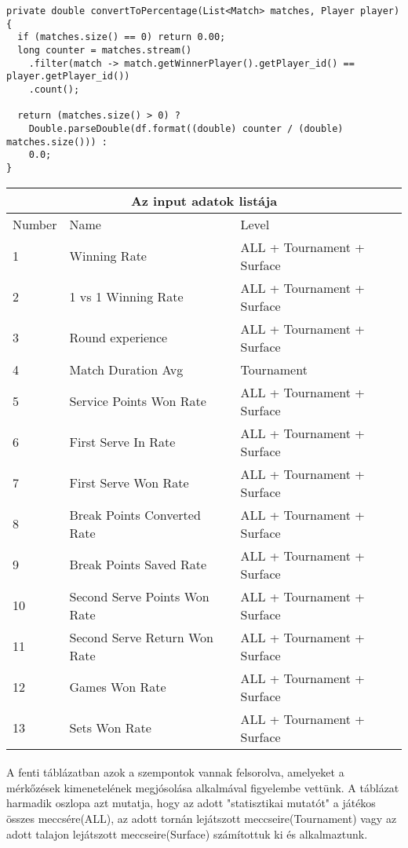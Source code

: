\begin{lstlisting}[caption= Egy játékos utolsó mérkőzéseinek győzelmi rátája]
private double convertToPercentage(List<Match> matches, Player player){
  if (matches.size() == 0) return 0.00;
  long counter = matches.stream()
    .filter(match -> match.getWinnerPlayer().getPlayer_id() == player.getPlayer_id())
    .count();

  return (matches.size() > 0) ? 
    Double.parseDouble(df.format((double) counter / (double) matches.size())) : 
    0.0;
}
\end{lstlisting}

\begin{tabular}{ |p{2cm}||p{6cm}|p{6cm}|  }
 \hline
 \multicolumn{3}{|c|}{Az input adatok listája} \\
 \hline
  Number & Name & Level \\
 \hline
 1   & Winning Rate                  & ALL + Tournament + Surface \\
 2   & 1 vs 1 Winning Rate           & ALL + Tournament + Surface \\
 3   & Round experience              & ALL + Tournament + Surface \\
 4   & Match Duration Avg            & Tournament  \\
 5   & Service Points Won Rate       & ALL + Tournament + Surface \\
 6   & First Serve In Rate           & ALL + Tournament + Surface \\
 7   & First Serve Won Rate          & ALL + Tournament + Surface \\
 8   & Break Points Converted Rate   & ALL + Tournament + Surface \\
 9   & Break Points Saved Rate       & ALL + Tournament + Surface \\
 10  & Second Serve Points Won Rate  & ALL + Tournament + Surface \\
 11  & Second Serve Return Won Rate  & ALL + Tournament + Surface \\
 12  & Games Won Rate                & ALL + Tournament + Surface \\
 13  & Sets Won Rate                 & ALL + Tournament + Surface \\
 \hline
\end{tabular}

\paragraph{}
A fenti táblázatban azok a szempontok vannak  felsorolva, amelyeket a mérkőzések kimenetelének megjósolása alkalmával figyelembe vettünk. A táblázat harmadik oszlopa azt mutatja, hogy az adott "statisztikai mutatót" a játékos összes meccsére(ALL), az adott tornán lejátszott meccseire(Tournament) vagy az adott talajon lejátszott meccseire(Surface) számítottuk ki és alkalmaztunk.

